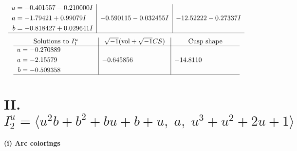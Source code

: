 \documentclass[1p]{elsarticle_modified}
\theoremstyle{definition}
\newcommand{\I}{\sqrt{-1}}
\begin{document}
$$\begin{array}{c|c|c}
\begin{aligned}
u &= -0.401557 - 0.210000 I \\
a &= -1.79421 + 0.99079 I \\
b &= -0.818427 + 0.029641 I\end{aligned}
 & -0.590115 - 0.032455 I & -12.52222 - 0.27337 I\\
 \hline 
 \end{array}$$\newpage$$\begin{array}{c|c|c}  
\text{Solutions to }I^u_{1}& \I (\text{vol} + \sqrt{-1}CS) & \text{Cusp shape}\\
 \hline 
\begin{aligned}
u &= -0.270889\phantom{ +0.000000I} \\
a &= -2.15579\phantom{ +0.000000I} \\
b &= -0.509358\phantom{ +0.000000I}\end{aligned}
 & -0.645856\phantom{ +0.000000I} & -14.8110\phantom{ +0.000000I}\\
 \hline 
 \end{array}$$\newpage\newpage\renewcommand{\arraystretch}{1}
\centering \section*{II. $I^u_{2}= \langle u^2 b+b^2+b u+b+u,\;a,\;u^3+u^2+2 u+1 \rangle$}
\flushleft \textbf{(i) Arc colorings}\\
\end{document}
